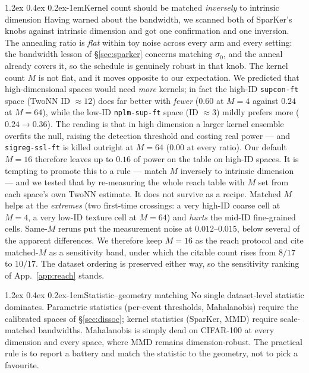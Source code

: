 \documentclass{article}
\makeatletter
\renewcommand\paragraph{\@startsection{paragraph}{4}{\z@}%
  {1.2ex \@plus 0.4ex \@minus 0.2ex}{-1em}{\normalsize\bf}}
\makeatother
\begin{document}
\paragraph{Kernel count should be matched \emph{inversely} to intrinsic dimension}
Having warned about the bandwidth, we scanned both of SparKer's knobs against
intrinsic dimension and got one confirmation and one inversion. The annealing
ratio is \emph{flat} within toy noise across every arm and every setting: the
bandwidth lesson of \S\ref{sec:sparker} concerns matching $\sigma_0$, and the
anneal already covers it, so the schedule is genuinely robust in that knob.
The kernel count $M$ is not flat, and it moves opposite to our expectation. We
predicted that high-dimensional spaces would need \emph{more} kernels; in fact
the high-ID \texttt{supcon-ft} space (TwoNN ID $\approx12$) does far better with
\emph{fewer} ($0.60$ at $M{=}4$ against $0.24$ at $M{=}64$), while the low-ID
\texttt{nplm-sup-ft} space (ID $\approx3$) mildly prefers more
($0.24 \to 0.36$). The reading is that in high dimension a larger kernel
ensemble overfits the null, raising the detection threshold and costing real
power --- and \texttt{sigreg-ssl-ft} is killed outright at $M{=}64$ ($0.00$ at
every ratio). Our default $M{=}16$ therefore leaves up to $0.16$ of power on the
table on high-ID spaces. It is tempting to promote this to a rule --- match $M$ inversely to intrinsic
dimension --- and we tested that by re-measuring the whole reach table with $M$
set from each space's own TwoNN estimate. It does not survive as a recipe.
Matched $M$ helps at the \emph{extremes} (two first-time crossings: a very
high-ID coarse cell at $M{=}4$, a very low-ID texture cell at $M{=}64$) and
\emph{hurts} the mid-ID fine-grained cells. Same-$M$ reruns put the measurement
noise at $0.012$--$0.015$, below several of the apparent differences. We
therefore keep $M{=}16$ as the reach protocol and cite matched-$M$ as a
sensitivity band, under which the citable count rises from $8/17$ to $10/17$.
The dataset ordering is preserved either way, so the sensitivity ranking of
App.~\ref{app:reach} stands.

\paragraph{Statistic--geometry matching}
No single dataset-level statistic dominates. Parametric statistics (per-event
thresholds, Mahalanobis) require the calibrated spaces of
\S\ref{sec:dissoc}; kernel statistics (SparKer, MMD) require scale-matched
bandwidths. Mahalanobis is simply dead on CIFAR-100 at every dimension and
every space, where MMD remains dimension-robust. The practical rule is to
report a battery and match the statistic to the geometry, not to pick a
favourite.
\end{document}
